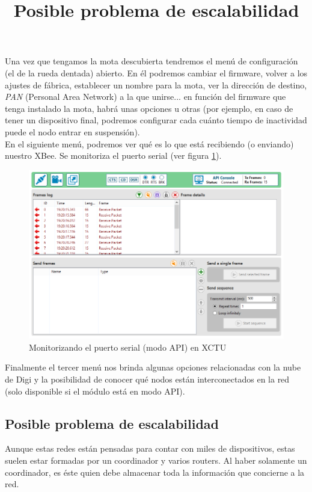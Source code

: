 Una vez que tengamos la mota descubierta tendremos el menú de configuración (el de la rueda dentada) abierto. En él podremos
cambiar el firmware, volver a los ajustes de fábrica, establecer un nombre para la mota, ver la dirección de destino,
\textit{PAN} (Personal Area Network) a la que unirse... en función del firmware que tenga instalado la mota, habrá unas opciones u otras
(por ejemplo, en caso de tener un dispositivo final, podremos configurar cada cuánto tiempo de inactividad puede el nodo
entrar en suspensión).\\

En el siguiente menú, podremos ver qué es lo que está recibiendo (o enviando) nuestro XBee.
Se monitoriza el puerto serial (ver figura \ref{fig:interfaz2}).\\

\begin{figure}[!htb]
\centering
\includegraphics[width=1\textwidth]{./imagenes/interfaz2}
\caption{Monitorizando el puerto serial (modo API) en XCTU} \label{fig:interfaz2}
\end{figure}

Finalmente el tercer menú nos brinda algunas opciones relacionadas con la nube de Digi y la posibilidad
de conocer qué nodos están interconectados en la red (solo disponible si el módulo está en modo API).\\

\subsection{Posible problema de escalabilidad}
\title{Posible problema de escalabilidad}

Aunque estas redes están pensadas para contar con miles de dispositivos,
estas suelen estar formadas por un coordinador y varios routers.
Al haber solamente un coordinador, es éste quien debe almacenar
toda la información que concierne a la red.\\

